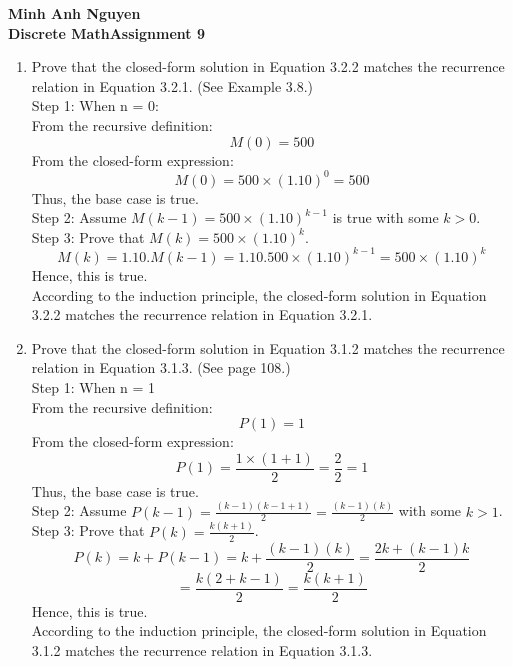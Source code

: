 \documentclass[12pt]{article}
\begin{document}
\textbf{Minh Anh Nguyen }\\
\textbf{Discrete Math\hfill Assignment 9}

\hrulefill

\begin{enumerate}
    \item Prove that the closed-form solution in Equation 3.2.2 matches the recurrence relation in Equation 3.2.1. (See Example 3.8.)\\
    Step 1: When n = 0:\\
    From the recursive definition:       
    \[M(0) = 500\]
    From the closed-form expression: 
    \[M(0) = 500 \times (1.10)^0 = 500\]
    Thus, the base case is true.\\
    Step 2: Assume $M(k-1) = 500 \times (1.10)^{k-1}$ is true with some $k > 0$.\\
    Step 3: Prove that $M(k) = 500 \times (1.10)^{k}$.\\
    \[M(k) = 1.10.M(k-1) = 1.10.500 \times (1.10)^{k-1} = 500 \times (1.10)^{k}\]
    Hence, this is true.\\
    According to the induction principle, the closed-form solution in Equation 3.2.2 matches the recurrence relation in Equation 3.2.1.

    \item Prove that the closed-form solution in Equation 3.1.2 matches the recurrence relation in Equation 3.1.3. (See page 108.)\\
    Step 1: When n = 1\\
    From the recursive definition:
    \[P(1) = 1\]    
    From the closed-form expression:
    \[P(1) = \frac{1\times(1+1)}{2} = \frac{2}{2} = 1\]
    Thus, the base case is true.\\
    Step 2: Assume $P(k-1) = \frac{(k-1)(k-1+1)}{2} = \frac{(k-1)(k)}{2}$ with some $k > 1$.\\
    Step 3: Prove that $P(k) = \frac{k(k+1)}{2}$.
    \[P(k) = k + P(k-1) = k + \frac{(k-1)(k)}{2} = \frac{2k + (k-1)k}{2}\]
    \[ = \frac{k(2+k-1)}{2} = \frac{k(k+1)}{2}\]
    Hence, this is true.\\
    According to the induction principle, the closed-form solution in Equation 3.1.2 matches the recurrence relation in Equation 3.1.3.


\end{enumerate}
\end{document}
